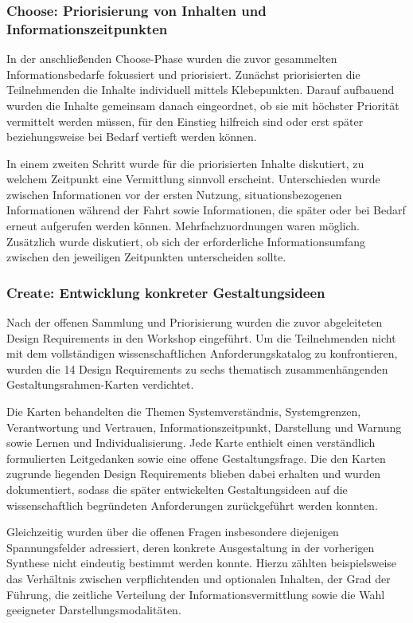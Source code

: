 \subsubsection{Choose: Priorisierung von Inhalten und Informationszeitpunkten}
\label{subsubsec:Choose}

In der anschließenden Choose-Phase wurden die zuvor gesammelten
Informationsbedarfe fokussiert und priorisiert. Zunächst priorisierten die Teilnehmenden die Inhalte individuell mittels Klebepunkten. Darauf aufbauend wurden die Inhalte gemeinsam danach eingeordnet, ob sie mit höchster Priorität vermittelt werden müssen, für den Einstieg hilfreich sind oder erst später beziehungsweise bei Bedarf vertieft werden können.

In einem zweiten Schritt wurde für die priorisierten Inhalte diskutiert, zu
welchem Zeitpunkt eine Vermittlung sinnvoll erscheint. Unterschieden wurde
zwischen Informationen vor der ersten Nutzung, situationsbezogenen
Informationen während der Fahrt sowie Informationen, die später oder bei
Bedarf erneut aufgerufen werden können. Mehrfachzuordnungen waren möglich.
Zusätzlich wurde diskutiert, ob sich der erforderliche Informationsumfang
zwischen den jeweiligen Zeitpunkten unterscheiden sollte.

\subsubsection{Create: Entwicklung konkreter Gestaltungsideen}
\label{subsubsec:Create}

Nach der offenen Sammlung und Priorisierung wurden die zuvor abgeleiteten
Design Requirements in den Workshop eingeführt. Um die Teilnehmenden nicht mit
dem vollständigen wissenschaftlichen Anforderungskatalog zu konfrontieren,
wurden die 14 Design Requirements zu sechs thematisch zusammenhängenden
Gestaltungsrahmen-Karten verdichtet.

Die Karten behandelten die Themen Systemverständnis, Systemgrenzen,
Verantwortung und Vertrauen, Informationszeitpunkt, Darstellung und Warnung
sowie Lernen und Individualisierung. Jede Karte enthielt einen verständlich
formulierten Leitgedanken sowie eine offene Gestaltungsfrage. Die den Karten
zugrunde liegenden Design Requirements blieben dabei erhalten und wurden
dokumentiert, sodass die später entwickelten Gestaltungsideen auf die
wissenschaftlich begründeten Anforderungen zurückgeführt werden konnten.

Gleichzeitig wurden über die offenen Fragen insbesondere diejenigen
Spannungsfelder adressiert, deren konkrete Ausgestaltung in der vorherigen
Synthese nicht eindeutig bestimmt werden konnte. Hierzu zählten beispielsweise
das Verhältnis zwischen verpflichtenden und optionalen Inhalten, der Grad der
Führung, die zeitliche Verteilung der Informationsvermittlung sowie die Wahl
geeigneter Darstellungsmodalitäten.

